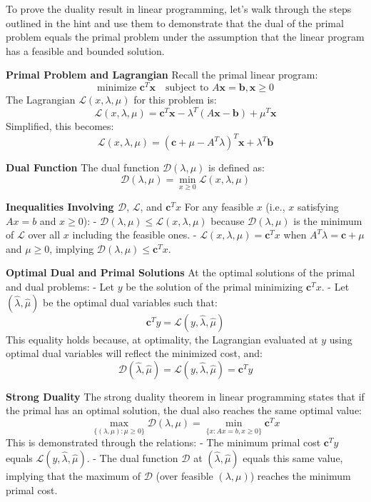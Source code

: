 \documentclass[8pt]{article}
\begin{document}
{To prove the duality result in linear programming, let's walk through the steps outlined in the hint and use them to demonstrate that the dual of the primal problem equals the primal problem under the assumption that the linear program has a feasible and bounded solution.

\textbf{Primal Problem and Lagrangian}
Recall the primal linear program:
\[
\text{minimize } \mathbf{c}^T \mathbf{x} \quad \text{subject to } A \mathbf{x} = \mathbf{b}, \mathbf{x} \geq 0
\]
The Lagrangian \(\mathcal{L}(x, \lambda, \mu)\) for this problem is:
\[
\mathcal{L}(x, \lambda, \mu) = \mathbf{c}^T \mathbf{x} - \lambda^T (A\mathbf{x} - \mathbf{b}) + \mu^T \mathbf{x}
\]
Simplified, this becomes:
\[
\mathcal{L}(x, \lambda, \mu) = (\mathbf{c} + \mu - A^T \lambda)^T \mathbf{x} + \lambda^T \mathbf{b}
\]

\textbf{Dual Function}
The dual function \(\mathcal{D}(\lambda, \mu)\) is defined as:
\[
\mathcal{D}(\lambda, \mu) = \min_{x \geq 0} \mathcal{L}(x, \lambda, \mu)
\]

\textbf{Inequalities Involving \(\mathcal{D}\)}, \(\mathcal{L}\), and \(\mathbf{c}^T x\)
For any feasible \(x\) (i.e., \(x\) satisfying \(Ax = b\) and \(x \geq 0\)):
- \(\mathcal{D}(\lambda, \mu) \leq \mathcal{L}(x, \lambda, \mu)\) because \(\mathcal{D}(\lambda, \mu)\) is the minimum of \(\mathcal{L}\) over all \(x\) including the feasible ones.
- \(\mathcal{L}(x, \lambda, \mu) = \mathbf{c}^T x\) when \(A^T \lambda = \mathbf{c} + \mu\) and \(\mu \geq 0\), implying \(\mathcal{D}(\lambda, \mu) \leq \mathbf{c}^T x\).

\textbf{Optimal Dual and Primal Solutions}
At the optimal solutions of the primal and dual problems:
- Let \(y\) be the solution of the primal minimizing \(\mathbf{c}^T x\).
- Let \((\hat{\lambda}, \hat{\mu})\) be the optimal dual variables such that:
  \[
  \mathbf{c}^T y = \mathcal{L}(y, \hat{\lambda}, \hat{\mu})
  \]
  This equality holds because, at optimality, the Lagrangian evaluated at \(y\) using optimal dual variables will reflect the minimized cost, and:
  \[
  \mathcal{D}(\hat{\lambda}, \hat{\mu}) = \mathcal{L}(y, \hat{\lambda}, \hat{\mu}) = \mathbf{c}^T y
  \]

\textbf{Strong Duality}
The strong duality theorem in linear programming states that if the primal has an optimal solution, the dual also reaches the same optimal value:
\[
\max_{\{(\lambda, \mu) : \mu \geq 0\}} \mathcal{D}(\lambda, \mu) = \min_{\{x : A x = b, x \geq 0\}} \mathbf{c}^T x
\]
This is demonstrated through the relations:
- The minimum primal cost \(\mathbf{c}^T y\) equals \(\mathcal{L}(y, \hat{\lambda}, \hat{\mu})\).
- The dual function \(\mathcal{D}\) at \((\hat{\lambda}, \hat{\mu})\) equals this same value, implying that the maximum of \(\mathcal{D}\) (over feasible \((\lambda, \mu)\)) reaches the minimum primal cost.


}
\end{document}
